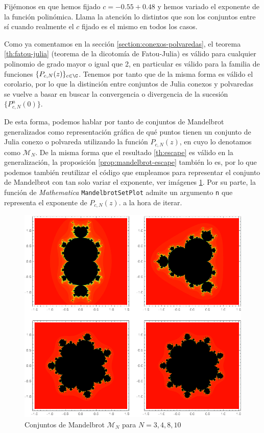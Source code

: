 Fijémonos en que hemos fijado $c=-0.55+0.48$ y hemos variado el exponente de la función polinómica. Llama la atención lo distintos que son los conjuntos entre sí cuando realmente el $c$ fijado es el mismo en todos los casos. 

Como ya comentamos en la sección \ref{section:conexos-polvaredas}, el teorema \ref{th:fatou-julia} (teorema de la dicotomía de Fatou-Julia) es válido para cualquier polinomio de grado mayor o igual que 2, en particular es válido para la familia de funciones $\{P_{c,N}(z)\}_{c\in\C}$. Tenemos por tanto que de la misma forma es válido el corolario, por lo que la distinción entre conjuntos de Julia conexos y polvaredas se vuelve a basar en buscar la convergencia o divergencia de la sucesión $\{P_{c,N}^n(0)\}$.

De esta forma, podemos hablar por tanto de conjuntos de Mandelbrot generalizados como representación gráfica de qué puntos tienen un conjunto de Julia conexo o polvareda utilizando la función $P_{c,N}(z)$, en cuyo lo denotamos como $\mathcal{M}_N$. De la misma forma que el resultado \ref{th:escape} es válido en la generalización, la proposición \ref{prop:mandelbrot-escape} también lo es, por lo que podemos también reutilizar el código que empleamos para representar el conjunto de Mandelbrot con tan solo variar el exponente, ver imágenes \ref{fig:mandelbrot-generalizados}. Por su parte, la función de \textit{Mathematica} \verb|MandelbrotSetPlot| admite un argumento \verb|n| que representa el exponente de $P_{c,N}(z).$ a la hora de iterar.

\begin{figure}[ht]
  \centering
  \includegraphics[scale=0.7]{./img/C3/mandelbrot-generalizado.png}
  \caption{Conjuntos de Mandelbrot $\mathcal{M}_N$ para $N=3,4,8,10$}
  \label{fig:mandelbrot-generalizados}
\end{figure}


